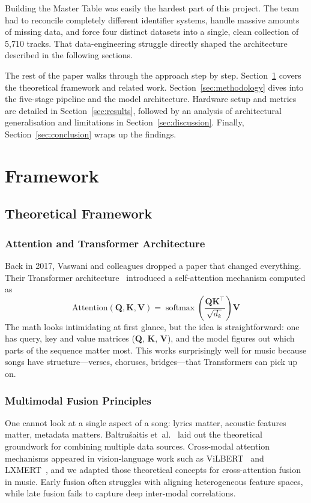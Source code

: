 \documentclass[]{ceurart}
\newcommand{\mat}[1]{\mathbf{#1}}
\newcommand{\softmax}{\operatorname{softmax}}
\begin{document}
Building the Master Table was easily the hardest part of this project. The team
had to reconcile completely different identifier systems, handle massive
amounts of missing data, and force four distinct datasets into a single, clean
collection of 5,710 tracks. That data-engineering struggle directly shaped the
architecture described in the following sections.

The rest of the paper walks through the approach step by step.
Section~\ref{sec:framework} covers the theoretical framework and related work.
Section~\ref{sec:methodology} dives into the five-stage pipeline and the model
architecture. Hardware setup and metrics are detailed in
Section~\ref{sec:results}, followed by an analysis of architectural
generalisation and limitations in Section~\ref{sec:discussion}. Finally,
Section~\ref{sec:conclusion} wraps up the findings.

\section{Framework}
\label{sec:framework}

\subsection{Theoretical Framework}
\label{sec:theoretical}

\subsubsection{Attention and Transformer Architecture}
Back in 2017, Vaswani and colleagues dropped a paper that changed everything.
Their Transformer architecture~\cite{vaswani2017attention} introduced a
self-attention mechanism computed as
\begin{equation}
\text{Attention}(\mat{Q},\mat{K},\mat{V})
  = \softmax\left(\frac{\mat{Q}\mat{K}^\top}{\sqrt{d_k}}\right)\mat{V}
\label{eq:attention}
\end{equation}
The math looks intimidating at first glance, but the idea is straightforward:
one has query, key and value matrices ($\mat{Q}$, $\mat{K}$, $\mat{V}$), and
the model figures out which parts of the sequence matter most. This works
surprisingly well for music because songs have structure---verses, choruses,
bridges---that Transformers can pick up on.

\subsubsection{Multimodal Fusion Principles}
One cannot look at a single aspect of a song: lyrics matter, acoustic features
matter, metadata matters. Baltru{\v{s}}aitis
et~al.~\cite{baltruvsaitis2019multimodal} laid out the theoretical groundwork for
combining
multiple data sources. Cross-modal attention mechanisms appeared in
vision-language work such as ViLBERT~\cite{lu2019vilbert} and
LXMERT~\cite{tan2019lxmert}, and we adapted those theoretical concepts for
cross-attention fusion in music. Early fusion often struggles with aligning
heterogeneous feature spaces, while late fusion fails to capture deep
inter-modal correlations.
\end{document}
